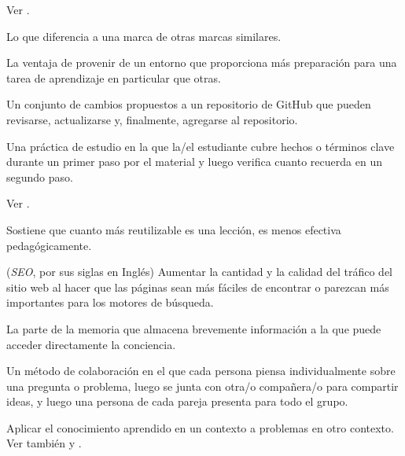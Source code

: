 \begin{description}
 Ver .




 Lo que diferencia a una marca de otras 
marcas similares.

 La ventaja de provenir de un entorno que proporciona más preparación para una tarea de aprendizaje en particular que otras.



 Un conjunto de cambios propuestos a un repositorio de 
GitHub que pueden revisarse, actualizarse y, finalmente, agregarse al repositorio.

 Una práctica de estudio 
en la que la/el estudiante cubre hechos o términos clave durante un primer paso por el material
y luego verifica cuanto recuerda en un segundo paso.

Ver .

 Sostiene que cuanto más reutilizable 
es una lección, es menos efectiva pedagógicamente.


 (\emph{SEO}, por sus siglas en Inglés)  Aumentar la cantidad y la calidad del tráfico del sitio web al hacer que las páginas sean más fáciles de encontrar o parezcan más importantes para los motores de búsqueda.



 La parte de la memoria que almacena brevemente información a la que puede acceder directamente la conciencia.














 Un método de colaboración 
en el que cada persona piensa individualmente sobre una pregunta o problema,
luego se junta con otra/o compañera/o para compartir ideas, y luego una persona de 
cada pareja presenta para todo el grupo.

 Aplicar el conocimiento aprendido en un contexto a problemas en otro contexto.  Ver también
 y .


\end{description}
